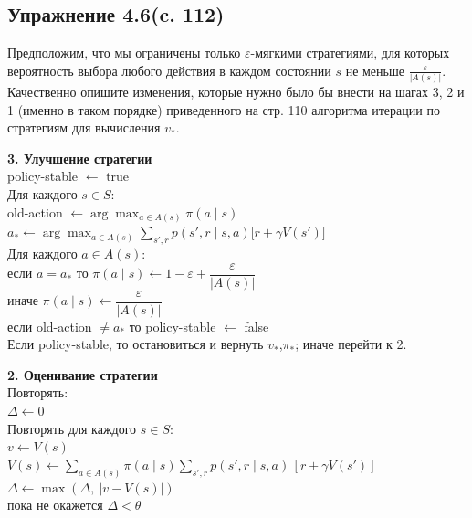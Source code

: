 \subsection{Упражнение 4.6(c. 112)}
Предположим, что мы ограничены только $\varepsilon$-мягкими стратегиями, для которых вероятность выбора любого действия в каждом состоянии $s$ не меньше $\frac{\varepsilon}{|A(s)|}$. Качественно опишите изменения, которые нужно было бы внести
на шагах 3, 2 и 1 (именно в таком порядке) приведенного на стр. 110 алгоритма итерации по стратегиям для вычисления $v_*$.
\begin{solution}

    \textbf{3. Улучшение стратегии}\\
    policy-stable $\leftarrow$ true\\
    Для каждого $s \in S$:\\
    \hspace*{5mm} old-action $\leftarrow \arg\max_{a\in A(s)} \pi(a\mid s)$\\
    \hspace*{5mm} $a_* \leftarrow \arg\max_{a\in A(s)}
    \sum_{s',r} p(s',r\mid s,a)\bigl[r+\gamma V(s')\bigr]$\\
    \hspace*{5mm} Для каждого $a \in A(s)$:\\
    \hspace*{5mm}\hspace*{5mm} если $a=a_*$
    то 
    $\pi(a\mid s) \leftarrow 1-\varepsilon+\dfrac{\varepsilon}{|A(s)|}$\\
    \hspace*{5mm}\hspace*{5mm} иначе 
    $\pi(a\mid s) \leftarrow \dfrac{\varepsilon}{|A(s)|}$\\
    \hspace*{5mm} если old-action $\neq a_*$ то policy-stable $\leftarrow$ false\\
    Если policy-stable, то остановиться и вернуть $v_*$,$\pi_*$;
    иначе перейти к 2.
    
    \vspace{5mm}
    
    \textbf{2. Оценивание стратегии}\\
    Повторять: \\
    \hspace*{5mm} $\Delta \leftarrow 0$\\
    \hspace*{5mm} Повторять для каждого $s \in S$: \\
    \hspace*{5mm}\hspace*{5mm} $v \leftarrow V(s)$\\
    \hspace*{5mm}\hspace*{5mm} $V(s) \leftarrow 
    \sum_{a \in A(s)} \pi(a \mid s)
    \sum_{s',r} p(s', r \mid s, a)\,[r + \gamma V(s')]$\\
    \hspace*{5mm}\hspace*{5mm} $\Delta \leftarrow \max(\Delta,\ |v - V(s)|)$\\
    пока не окажется $\Delta < \theta$


\end{solution}
